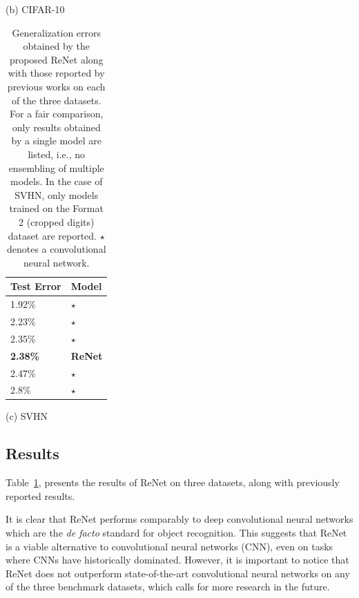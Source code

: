 \begin{table}[t]
\begin{minipage}{0.45\textwidth}
            \vspace{2mm}
            (b) CIFAR-10
        \end{minipage}

        \vspace{4mm}
        \begin{minipage}{0.45\textwidth}
            \centering
            \begin{tabular}{l |  l}
                Test Error & Model  \\
                \hline
    1.92\% & \citep{DBLP:journals/corr/LeeXGZT14}$\star$ \\
    2.23\% & \citep{DBLP:conf/icml/WanZZLF13}$\star$ \\
    2.35\% & \citep{Lin2014}$\star$ \\
    \bf{2.38\%} & \bf{ReNet} \\
    2.47\% & \citep{Goodfellow2013}$\star$ \\
    2.8\% & \citep{DBLP:journals/corr/abs-1301-3557}$\star$ \\
            \end{tabular}

            \vspace{2mm}
            (c) SVHN
        \end{minipage}
        \hfill
        \begin{minipage}{0.51\textwidth}
            \caption{Generalization errors obtained by the proposed ReNet along
                with those reported by previous works on each of the three
                datasets. For a fair comparison, only results obtained by a
                single model are listed, i.e., no ensembling of multiple
                models. In the case of SVHN, only models trained on the Format
                2 (cropped digits) dataset are reported. $\star$ denotes a
                convolutional neural network.}
            \label{tbl:renet_result}
        \end{minipage}
    \end{table}

\subsection{Results}\label{sec:renet_results}

Table~\ref{tbl:renet_result}, presents the results of ReNet on three datasets,
along with previously reported results.

It is clear that ReNet performs comparably to deep convolutional neural
networks which are the {\it de facto} standard for object recognition. This
suggests that ReNet is a viable alternative to convolutional neural networks
(CNN), even on tasks where CNNs have historically dominated.  However, it is
important to notice that ReNet does not outperform state-of-the-art
convolutional neural networks on any of the three benchmark datasets, which
calls for more research in the future.


